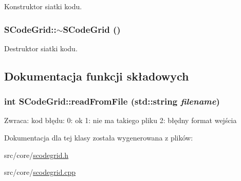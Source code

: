 Konstruktor siatki kodu. \hypertarget{classSCodeGrid_c150afdd8f27785b5ddf5669a4d90332}{
\subsubsection[{$\sim$SCodeGrid}]{\setlength{\rightskip}{0pt plus 5cm}SCodeGrid::$\sim$SCodeGrid ()}}
\label{classSCodeGrid_c150afdd8f27785b5ddf5669a4d90332}


Destruktor siatki kodu. 

\subsection{Dokumentacja funkcji składowych}
\hypertarget{classSCodeGrid_46ed88ad7346788efb14c40cbd836981}{
\subsubsection[{readFromFile}]{\setlength{\rightskip}{0pt plus 5cm}int SCodeGrid::readFromFile (std::string {\em filename})}}
\label{classSCodeGrid_46ed88ad7346788efb14c40cbd836981}


\begin{Desc}
\item[Zwraca:]kod błędu: 0: ok 1: nie ma takiego pliku 2: błędny format wejścia \end{Desc}


Dokumentacja dla tej klasy została wygenerowana z plików:\begin{CompactItemize}
\item 
src/core/\hyperlink{scodegrid_8h}{scodegrid.h}\item 
src/core/\hyperlink{scodegrid_8cpp}{scodegrid.cpp}\end{CompactItemize}
